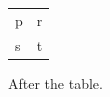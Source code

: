 \documentclass{article}
\begin{document}
\begin{tabular}{ll}
p} \textbf{q & r\\
s & t
\end{tabular}
After the table.
\end{document}
